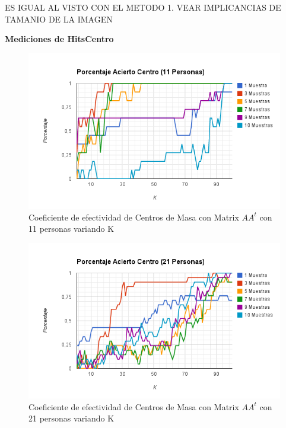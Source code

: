 ES IGUAL AL VISTO CON EL METODO 1. VEAR IMPLICANCIAS DE TAMANIO DE LA IMAGEN

\textbf{Mediciones de HitsCentro }

\begin{figure}[H]
\includegraphics[width=1\textwidth]{img/imagef13.png}
     \caption{Coeficiente de efectividad de Centros de Masa con Matrix $AA^t$ con 11 personas variando K}
\end{figure}

\begin{figure}[H]
\includegraphics[width=1\textwidth]{img/imagef14.png}
     \caption{Coeficiente de efectividad de Centros de Masa con Matrix $AA^t$ con 21 personas variando K}
\end{figure}

